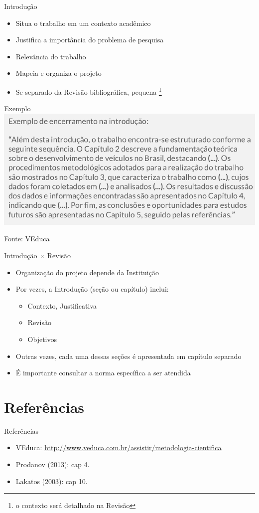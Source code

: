 \documentclass{beamer}
\begin{document}
\begin{frame}{Introdução}
  \begin{itemize}
  \item Situa o trabalho em um contexto acadêmico
  \item Justifica a importância do problema de pesquisa
  \item Relevância do trabalho
  \item Mapeia e organiza o projeto
  \item Se separado da Revisão bibliográfica, pequena \footnote{o
      contexto será detalhado na Revisão}
  \end{itemize}
\end{frame}

\begin{frame}{Exemplo}
  \includegraphics[width=\textwidth]{ProjetoI/exemplo-introducao}

  Fonte: VEduca
\end{frame}

\begin{frame}{Introdução $\times$ Revisão}
  \begin{itemize}
  \item Organização do projeto depende da Instituição
  \item Por vezes, a Introdução (seção ou capítulo) inclui:
    \begin{itemize}
    \item<3-> Contexto, Justificativa
    \item<3-> Revisão
    \item<3-> Objetivos
    \end{itemize}
  \item Outras vezes, cada uma dessas seções é apresentada em capítulo
    separado
  \item É importante \alert{consultar} a norma \alert{específica} a
    ser atendida
  \end{itemize}
\end{frame}

\section{Referências}

\begin{frame}{Referências}
  \begin{itemize}
  \item<1-> VEduca:
    \url{http://www.veduca.com.br/assistir/metodologia-cientifica}
  \item<1-> Prodanov (2013): cap 4.
  \item<1-> Lakatos (2003): cap 10.
  \end{itemize}
\end{frame}
\end{document}
